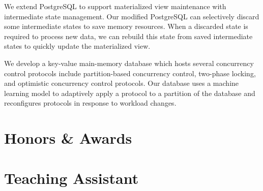 \documentclass[10pt]{article} %
\begin{document}
{We extend PostgreSQL to support materialized view maintenance with intermediate state management. 
Our modified PostgreSQL can selectively discard some intermediate states to save memory resources. 
When a discarded state is required to process new data, we can rebuild this state from saved intermediate states 
to quickly update the materialized view.
}

{We develop a key-value main-memory database which hosts several concurrency control protocols 
include partition-based concurrency control, two-phase locking, and optimistic concurrency control protocols. 
Our database uses a machine learning model to adaptively apply a protocol to a partition of the database 
and reconfigures protocols in response to workload changes.}



\section{Honors \& Awards}

\vspace{-5mm}



\section{Teaching Assistant}

\vspace{-5mm}
\end{document}
